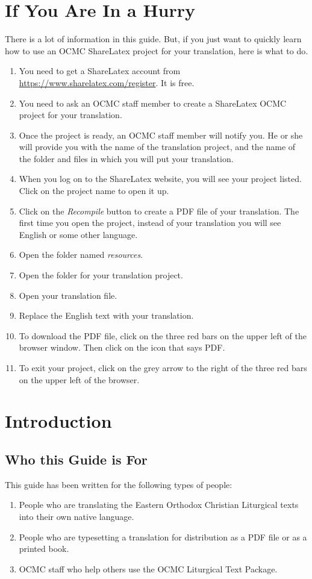 \documentclass[]{memoir}
\begin{document}
\chapter{If You Are In a Hurry}
There is a lot of information in this guide.  But, if you just want to quickly learn how to use an OCMC ShareLatex project for your translation, here is what to do.
\begin{enumerate}
    \item You need to get a ShareLatex account from \url{https://www.sharelatex.com/register}.  It is free.
    \item You need to ask an OCMC staff member to create a ShareLatex OCMC project for your translation.  
    \item Once the project is ready, an OCMC staff member will notify you.  He or she will provide you with the name of the translation project, and the name of the folder and files in which you will put your translation.
    \item When you log on to the ShareLatex website, you will see your project listed.  Click on the project name to open it up.
    \item Click on the \textit{Recompile} button to create a PDF file of your translation.  The first time you open the project, instead of your translation you will see English or some other language.
    \item Open the folder named \textit{resources}.
    \item Open the folder for your translation project.
    \item Open your translation file.
    \item Replace the English text with your translation.
    \item To download the PDF file, click on the three red bars on the upper left of the browser window. Then click on the icon that says PDF.  
    \item To exit your project, click on the grey arrow to the right of the three red bars on the upper left of the browser.
\end{enumerate}
\chapter{Introduction}
\section{Who this Guide is For}
This guide has been written for the following types of people:
\begin{enumerate}
    \item People who are translating the Eastern Orthodox Christian Liturgical texts into their own native language.
    \item People who are typesetting a translation for distribution as a PDF file or as a printed book.
    \item OCMC staff who help others use the OCMC Liturgical Text Package.
\end{enumerate}
\end{document}
